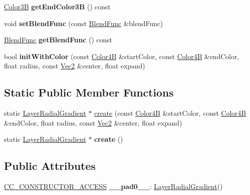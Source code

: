 \begin{DoxyCompactItemize}
\hyperlink{structColor3B}{Color3B} {\bfseries get\+End\+Color3B} () const
\item 
\mbox{\label{classLayerRadialGradient_a491a786e9a757332d209cdebd7a8dd74}} 
void {\bfseries set\+Blend\+Func} (const \hyperlink{structBlendFunc}{Blend\+Func} \&blend\+Func)
\item 
\mbox{\label{classLayerRadialGradient_a7cc353d1b2defa8885527dc45283da52}} 
\hyperlink{structBlendFunc}{Blend\+Func} {\bfseries get\+Blend\+Func} () const
\item 
\mbox{\label{classLayerRadialGradient_a4a03794f85541d2bbedb5cee6f6c5cd7}} 
bool {\bfseries init\+With\+Color} (const \hyperlink{structColor4B}{Color4B} \&start\+Color, const \hyperlink{structColor4B}{Color4B} \&end\+Color, float radius, const \hyperlink{classVec2}{Vec2} \&center, float expand)
\end{DoxyCompactItemize}
\subsection*{Static Public Member Functions}
\begin{DoxyCompactItemize}
\item 
static \hyperlink{classLayerRadialGradient}{Layer\+Radial\+Gradient} $\ast$ \hyperlink{classLayerRadialGradient_a99fc7fcdd9828907ed9873c576d2f790}{create} (const \hyperlink{structColor4B}{Color4B} \&start\+Color, const \hyperlink{structColor4B}{Color4B} \&end\+Color, float radius, const \hyperlink{classVec2}{Vec2} \&center, float expand)
\item 
\mbox{\label{classLayerRadialGradient_aaa29b559c357a33eb73ce4c9d24ca9d4}} 
static \hyperlink{classLayerRadialGradient}{Layer\+Radial\+Gradient} $\ast$ {\bfseries create} ()
\end{DoxyCompactItemize}
\subsection*{Public Attributes}
\begin{DoxyCompactItemize}
\item 
\mbox{\label{classLayerRadialGradient_afed71b7e65a9b83be1d505cc7b3a5fc8}} 
\hyperlink{_2cocos2d_2cocos_2base_2ccConfig_8h_a25ef1314f97c35a2ed3d029b0ead6da0}{C\+C\+\_\+\+C\+O\+N\+S\+T\+R\+U\+C\+T\+O\+R\+\_\+\+A\+C\+C\+E\+SS} {\bfseries \+\_\+\+\_\+pad0\+\_\+\+\_\+}\+: \hyperlink{classLayerRadialGradient}{Layer\+Radial\+Gradient}()
\end{DoxyCompactItemize}
